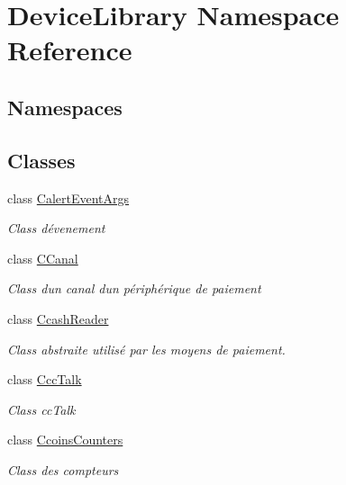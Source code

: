 \hypertarget{namespace_device_library}{}\section{Device\+Library Namespace Reference}
\label{namespace_device_library}
\subsection*{Namespaces}
\begin{DoxyCompactItemize}
\end{DoxyCompactItemize}
\subsection*{Classes}
\begin{DoxyCompactItemize}
\item 
class \mbox{\hyperlink{class_device_library_1_1_calert_event_args}{Calert\+Event\+Args}}
\begin{DoxyCompactList}\small\item\em Class d\textquotesingle{}évenement \end{DoxyCompactList}\item 
class \mbox{\hyperlink{class_device_library_1_1_c_canal}{C\+Canal}}
\begin{DoxyCompactList}\small\item\em Class d\textquotesingle{}un canal d\textquotesingle{}un périphérique de paiement \end{DoxyCompactList}\item 
class \mbox{\hyperlink{class_device_library_1_1_ccash_reader}{Ccash\+Reader}}
\begin{DoxyCompactList}\small\item\em Class abstraite utilisé par les moyens de paiement. \end{DoxyCompactList}\item 
class \mbox{\hyperlink{class_device_library_1_1_ccc_talk}{Ccc\+Talk}}
\begin{DoxyCompactList}\small\item\em Class cc\+Talk \end{DoxyCompactList}\item 
class \mbox{\hyperlink{class_device_library_1_1_ccoins_counters}{Ccoins\+Counters}}
\begin{DoxyCompactList}\small\item\em Class des compteurs \end{DoxyCompactList}\item 

\end{DoxyCompactItemize}
